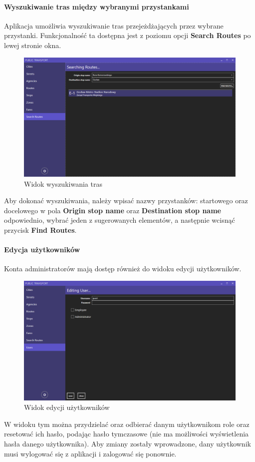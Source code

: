 \documentclass[10pt,a4paper]{article}
\begin{document}
\paragraph{Wyszukiwanie tras między wybranymi przystankami}
Aplikacja umożliwia wyszukiwanie tras przejeżdżających przez wybrane przystanki. Funkcjonalność ta dostępna jest z poziomu opcji \textbf{Search Routes} po lewej stronie okna.
\begin{figure}[H]
	\centering
	\includegraphics[width=15cm]{Resources/Images/23_search_routes.PNG}
	\caption{Widok wyszukiwania tras}
\end{figure}
Aby dokonać wyszukiwania, należy wpisać nazwy przystanków: startowego oraz docelowego w pola \textbf{Origin stop name} oraz \textbf{Destination stop name} odpowiednio, wybrać jeden z sugerowanych elementów, a następnie wcisnąć przycisk \textbf{Find Routes}.

\paragraph{Edycja użytkowników}
Konta administratorów mają dostęp również do widoku edycji użytkowników.
\begin{figure}[H]
	\centering
	\includegraphics[width=15cm]{Resources/Images/19_edit_user.png}
	\caption{Widok edycji użytkowników}
\end{figure}
W widoku tym można przydzielać oraz odbierać danym użytkownikom role oraz resetować ich hasło, podając hasło tymczasowe (nie ma możliwości wyświetlenia hasła danego użytkownika). Aby zmiany zostały wprowadzone, dany użytkownik musi wylogować się z aplikacji i zalogować się ponownie.
\end{document}

